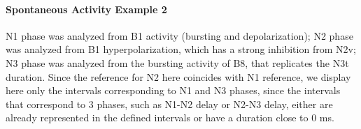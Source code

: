 \paragraph{Spontaneous Activity Example 2}
N1 phase was analyzed from B1 activity (bursting and depolarization); N2 phase was analyzed from B1 hyperpolarization, which has a strong inhibition from N2v; N3 phase was analyzed from the bursting activity of B8, that replicates the N3t duration. 
Since the reference for N2 here coincides with N1 reference, we display here only the intervals corresponding to N1 and N3 phases, since the intervals that correspond to 3 phases, such as N1-N2 delay or N2-N3 delay, either are already represented in the defined intervals or have a duration close to 0 ms.



